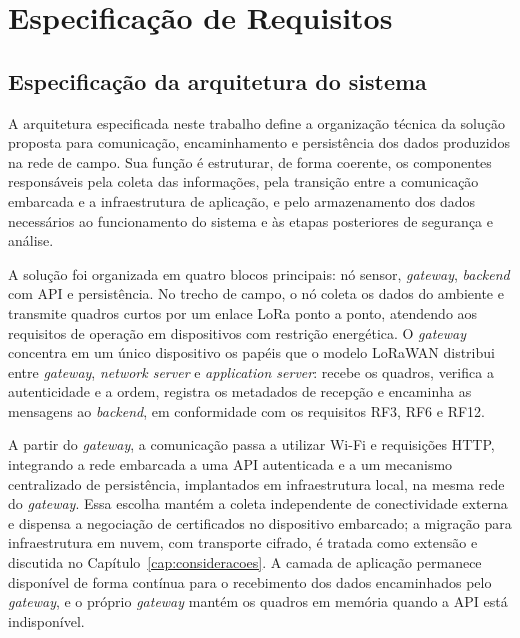 \chapter{Especificação de Requisitos} \label{cap:especificacao}


\section{Especificação da arquitetura do sistema}
\label{sec:requisitos_infra}

A arquitetura especificada neste trabalho define a organização técnica da solução proposta para comunicação, encaminhamento e persistência dos dados produzidos na rede de campo. Sua função é estruturar, de forma coerente, os componentes responsáveis pela coleta das informações, pela transição entre a comunicação embarcada e a infraestrutura de aplicação, e pelo armazenamento dos dados necessários ao funcionamento do sistema e às etapas posteriores de segurança e análise.

A solução foi organizada em quatro blocos principais: nó sensor, \textit{gateway}, \textit{backend} com API e persistência. No trecho de campo, o nó coleta os dados do ambiente e transmite quadros curtos por um enlace LoRa ponto a ponto, atendendo aos requisitos de operação em dispositivos com restrição energética. O \textit{gateway} concentra em um único dispositivo os papéis que o modelo LoRaWAN distribui entre \textit{gateway}, \textit{network server} e \textit{application server}: recebe os quadros, verifica a autenticidade e a ordem, registra os metadados de recepção e encaminha as mensagens ao \textit{backend}, em conformidade com os requisitos RF3, RF6 e RF12.

A partir do \textit{gateway}, a comunicação passa a utilizar Wi-Fi e requisições HTTP, integrando a rede embarcada a uma API autenticada e a um mecanismo centralizado de persistência, implantados em infraestrutura local, na mesma rede do \textit{gateway}. Essa escolha mantém a coleta independente de conectividade externa e dispensa a negociação de certificados no dispositivo embarcado; a migração para infraestrutura em nuvem, com transporte cifrado, é tratada como extensão e discutida no Capítulo~\ref{cap:consideracoes}. A camada de aplicação permanece disponível de forma contínua para o recebimento dos dados encaminhados pelo \textit{gateway}, e o próprio \textit{gateway} mantém os quadros em memória quando a API está indisponível.

